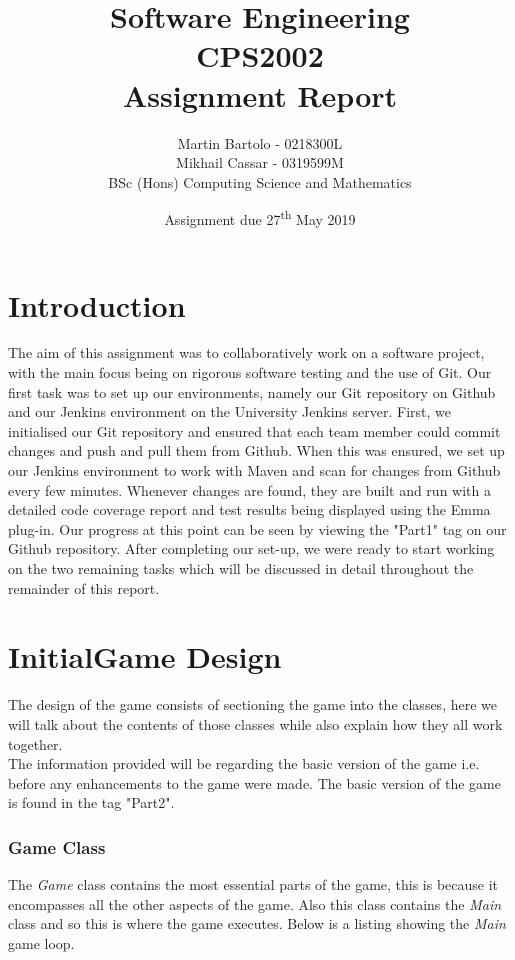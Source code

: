 \documentclass[a4paper,12pt]{extarticle}
\title{\textbf{Software Engineering\\\vspace{5mm} CPS2002\\\vspace{5mm}  Assignment Report}}
\author{\LARGE Martin Bartolo - 0218300L\vspace{1mm}\\ \LARGE Mikhail Cassar - 0319599M\vspace{3mm}\\ \large BSc (Hons) Computing Science and Mathematics}
\date{Assignment due 27\textsuperscript{th} May 2019}
\begin{document}
\setlength{\parindent}{10pt}
\setlength{\footskip}{50pt}

\maketitle
\thispagestyle{empty}
\newpage

\tableofcontents
\newpage

\section{Introduction}
The aim of this assignment was to collaboratively work on a software project, with the main focus being on rigorous software testing and the use of Git. Our first task was to set up our environments, namely our Git repository on Github and our Jenkins environment on the University Jenkins server. First, we initialised our Git repository and ensured that each team member could commit changes and push and pull them from Github. When this was ensured, we set up our Jenkins environment to work with Maven and scan for changes from Github every few minutes. Whenever changes are found, they are built and run with a detailed code coverage report and test results being displayed using the Emma plug-in. Our progress at this point can be seen by viewing the "Part1" tag on our Github repository. After completing our set-up, we were ready to start working on the two remaining tasks which will be discussed in detail throughout the remainder of this report.
\newpage

\section{InitialGame Design}
\noindent The design of the game consists of sectioning the game into the classes, here we will talk about the contents of those classes while also explain how they all work together.\\

\noindent The information provided will be regarding the basic version of the game i.e. before any enhancements to the game were made. The basic version of the game is found in the tag "Part2".

\subsubsection{Game Class}

\noindent The \textit{Game} class contains the most essential parts of the game, this is because it encompasses all the other aspects of the game. Also this class contains the \textit{Main} class and so this is where the game executes. Below is a listing showing the \textit{Main} game loop.
\end{document}
